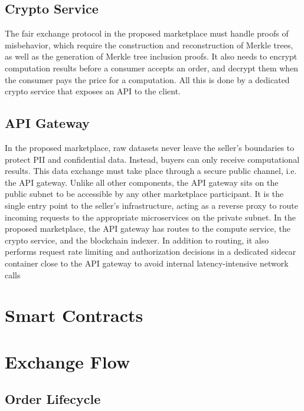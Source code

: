 \subsection{Crypto Service}
\label{subsec:crypto}

The fair exchange protocol in the proposed marketplace must handle proofs of misbehavior, which require the construction and reconstruction of Merkle trees, as well as the generation of Merkle tree inclusion proofs. It also needs to encrypt computation results before a consumer accepts an order, and decrypt them when the consumer pays the price for a computation. All this is done by a dedicated crypto service that exposes an API to the client.

\subsection{API Gateway}
\label{subsec:api_gw}

In the proposed marketplace, raw datasets never leave the seller's boundaries to protect PII and confidential data. Instead, buyers can only receive computational results. This data exchange must take place through a secure public channel, i.e. the API gateway. Unlike all other components, the API gateway sits on the public subnet to be accessible by any other marketplace participant. It is the single entry point to the seller's infrastructure, acting as a reverse proxy to route incoming requests to the appropriate microservices on the private subnet. In the proposed marketplace, the API gateway has routes to the compute service, the crypto service, and the blockchain indexer. In addition to routing, it also performs request rate limiting and authorization decisions in a dedicated sidecar container close to the API gateway to avoid internal latency-intensive network calls

\section{Smart Contracts}
\label{section:smartcontracts}

\section{Exchange Flow}
\label{section:exchange}

\subsection{Order Lifecycle}
\label{subsection:lifecycle}

